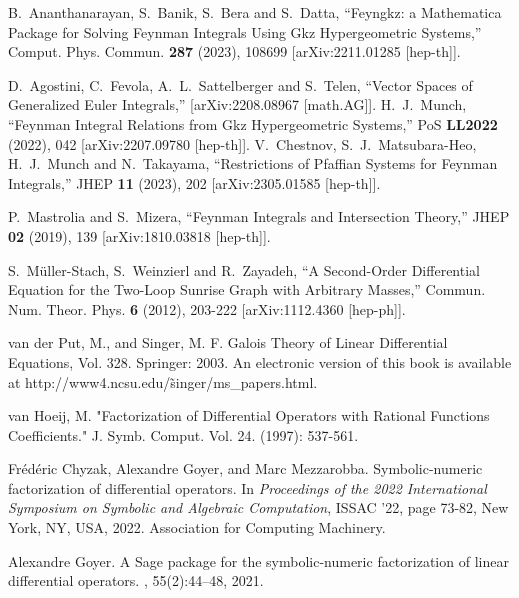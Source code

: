 \documentclass[a4paper,12pt]{article}
\numberwithin{equation}{section}
\numberwithin{figure}{section}
\begin{document}
\begin{thebibliography}{99}
B.~Ananthanarayan, S.~Banik, S.~Bera and S.~Datta,
``Feyngkz: a Mathematica Package for Solving Feynman Integrals Using Gkz Hypergeometric Systems,''
Comput. Phys. Commun. \textbf{287} (2023), 108699
[arXiv:2211.01285 [hep-th]].

D.~Agostini, C.~Fevola, A.~L.~Sattelberger and S.~Telen,
``Vector Spaces of Generalized Euler Integrals,''
[arXiv:2208.08967 [math.AG]].
H.~J.~Munch,
``Feynman Integral Relations from Gkz Hypergeometric Systems,''
PoS \textbf{LL2022} (2022), 042
[arXiv:2207.09780 [hep-th]].
V.~Chestnov, S.~J.~Matsubara-Heo, H.~J.~Munch and N.~Takayama,
``Restrictions of Pfaffian Systems for Feynman Integrals,''
JHEP \textbf{11} (2023), 202
[arXiv:2305.01585 [hep-th]].

P.~Mastrolia and S.~Mizera,
``Feynman Integrals and Intersection Theory,''
JHEP \textbf{02} (2019), 139
[arXiv:1810.03818 [hep-th]].

S.~M\"uller-Stach, S.~Weinzierl and R.~Zayadeh,
``A Second-Order Differential Equation for the Two-Loop Sunrise Graph with Arbitrary Masses,''
Commun. Num. Theor. Phys. \textbf{6} (2012), 203-222
[arXiv:1112.4360 [hep-ph]].

  
 van der Put, M., and Singer, M. F. Galois Theory of Linear Differential Equations, Vol. 328. Springer: 2003. An electronic version of this book is available at http://www4.ncsu.edu/\~singer/ms\_papers.html.

  van Hoeij, M. "Factorization of Differential Operators with Rational Functions Coefficients." J. Symb. Comput. Vol. 24. (1997): 537-561.

Fr\'{e}d\'{e}ric Chyzak, Alexandre Goyer, and Marc Mezzarobba.
\newblock Symbolic-numeric factorization of differential operators.
\newblock In {\em Proceedings of the 2022 International Symposium on Symbolic
  and Algebraic Computation}, ISSAC '22, page 73-82, New York, NY, USA, 2022.
Association for Computing Machinery.
\newblock [arXiv:2205.08991]

Alexandre Goyer.
\newblock A {S}age package for the symbolic-numeric factorization of linear
  differential operators.
, 55(2):44--48,
2021.


\end{thebibliography}
\end{document}
